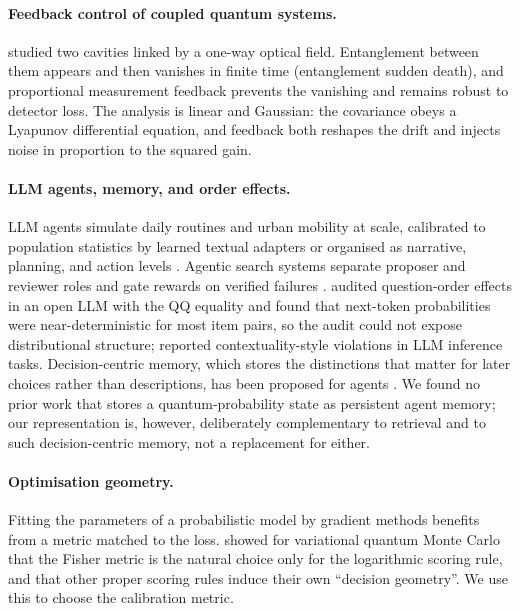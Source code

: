 \documentclass[11pt]{article}
\theoremstyle{definition}
\theoremstyle{remark}
\begin{document}
\paragraph{Feedback control of coupled quantum systems.} \citet{yamamoto2008cdc,yamamoto2008pra} studied two cavities linked by a one-way optical field. Entanglement between them appears and then vanishes in finite time (entanglement sudden death), and proportional measurement feedback prevents the vanishing and remains robust to detector loss. The analysis is linear and Gaussian: the covariance obeys a Lyapunov differential equation, and feedback both reshapes the drift and injects noise in proportion to the squared gain.

\paragraph{LLM agents, memory, and order effects.} LLM agents simulate daily routines and urban mobility at scale, calibrated to population statistics by learned textual adapters \citep{bougie2026cityreal} or organised as narrative, planning, and action levels \citep{li2025narrative}. Agentic search systems separate proposer and reviewer roles and gate rewards on verified failures \citep{ye2026agonalpha}. \citet{kang2026} audited question-order effects in an open LLM with the QQ equality and found that next-token probabilities were near-deterministic for most item pairs, so the audit could not expose distributional structure; \citet{kumar2026} reported contextuality-style violations in LLM inference tasks. Decision-centric memory, which stores the distinctions that matter for later choices rather than descriptions, has been proposed for agents \citep{zou2026demem}. We found no prior work that stores a quantum-probability state as persistent agent memory; our representation is, however, deliberately complementary to retrieval and to such decision-centric memory, not a replacement for either.

\paragraph{Optimisation geometry.} Fitting the parameters of a probabilistic model by gradient methods benefits from a metric matched to the loss. \citet{drissi2025} showed for variational quantum Monte Carlo that the Fisher metric is the natural choice only for the logarithmic scoring rule, and that other proper scoring rules \citep{gneiting2007} induce their own ``decision geometry''. We use this to choose the calibration metric.
\end{document}
